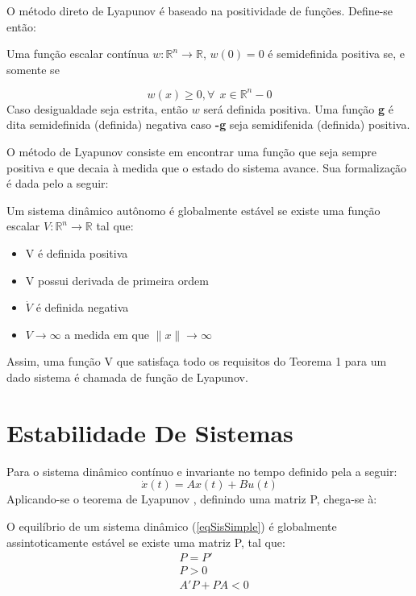 O método direto de Lyapunov é baseado na positividade de funções. Define-se então:

\begin{mydef}
Uma função escalar contínua $w: \mathbb{R}^n \rightarrow \mathbb{R}$, $w(0) = 0$ é semidefinida positiva se, e somente se

	\begin{equation}
		w(x) \geq 0, \forall \ \ x \in \mathbb{R}^n - {0}
	\end{equation}
	Caso desigualdade seja estrita, então $w$ será definida positiva. Uma função \textbf{g} é dita semidefinida (definida) negativa caso \textbf{-g} seja semidifenida (definida) positiva.
\end{mydef}

O método de Lyapunov consiste em encontrar uma função que seja sempre positiva e que decaia à medida que o estado do sistema avance. Sua formalização é dada pelo  a seguir:

\begin{myteo} \label{teoLyapunov}
	Um sistema dinâmico autônomo é globalmente estável se existe uma função escalar $V : \mathbb{R}^n \rightarrow \mathbb{R} $ tal que:
	
	\begin{itemize}
		\item V é definida positiva
		\item V possui derivada de primeira ordem
		\item $\dot{V}$ é definida negativa
		\item $V \rightarrow \infty$ a medida em que $\|x\| \rightarrow \infty$
	\end{itemize}
\end{myteo}

Assim, uma função V que satisfaça todo os requisitos do Teorema 1 para um dado sistema é chamada de função de Lyapunov. 

\section{Estabilidade De Sistemas}
Para o sistema dinâmico contínuo e invariante no tempo definido pela  a seguir:
\begin{equation} \label{eqSisSimple}
	\dot{x}(t) = Ax(t) + Bu(t)
\end{equation}
Aplicando-se o teorema de Lyapunov \cite{wang}, definindo uma matriz P, chega-se à:

\begin{myteo}
	O equilíbrio de um sistema dinâmico (\ref{eqSisSimple}) é globalmente assintoticamente estável se existe uma matriz P, tal que:
	\begin{align*}
		&P=P'  \\
		&P > 0 \\
		&A'P + P A < 0
	\end{align*}
\end{myteo}

